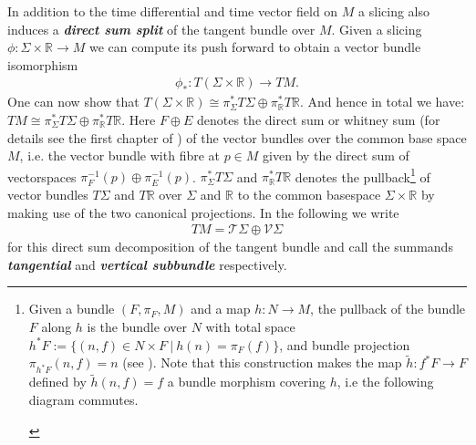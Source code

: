 \documentclass[a4paper,12pt, DIV=14, BCOR=5mm, twoside, headsepline]{scrbook}
\begin{document}
In addition to the time differential and time vector field on $M$ a slicing also induces a \textbf{\textit{direct sum split}} of the tangent bundle over $M$. Given a slicing $\phi : \Sigma \times \mathbb{R} \rightarrow M$ we can compute its push forward to obtain a vector bundle isomorphism
\begin{align}
\phi_{\ast}: T(\Sigma \times \mathbb{R}) \longrightarrow TM.
\end{align}
One can now show that $T(\Sigma \times \mathbb{R}) \cong \pi_{\Sigma}^{\ast}T\Sigma \oplus \pi_{\mathbb{R}}^{\ast} T\mathbb{R}$. And hence in total we have: $TM \cong \pi_{\Sigma}^{\ast}T\Sigma \oplus \pi_{\mathbb{R}}^{\ast} T\mathbb{R}$.
Here $F\oplus E$ denotes the direct sum or whitney sum (for details see the first chapter of \cite{nla.cat-vn705150}) of the vector bundles over the common base space $M$, i.e. the vector bundle with fibre at $p \in M$ given by the direct sum of vectorspaces $\pi_F^{-1}(p) \oplus \pi_E^{-1}(p)$. $\pi_{\Sigma}^{\ast}T\Sigma$ and $\pi_{\mathbb{R}}^{\ast}T\mathbb{R}$ denotes the pullback\footnote{Given a bundle $(F,\pi_F,M)$ and a map $h: N \rightarrow M$, the pullback of the bundle $F$ along $h$ is the bundle over $N$ with total space $h^{\ast}F := \{ (n,f) \in N \times F \ \vert \  h(n) = \pi_F(f)\}$, and bundle projection $\pi_{h^{\ast}F}(n,f) = n$ (see \cite{doi:10.1142/3867}). Note that this construction makes the map $\tilde{h}: f^{\ast}F \rightarrow F$ defined by $\tilde{h}(n,f) = f$ a bundle morphism covering $h$, i.e the following diagram commutes. 
\begin{center}
\end{center}} of vector bundles $T\Sigma$ and $T\mathbb{R}$ over $\Sigma$ and $\mathbb{R}$ to the common basespace $\Sigma \times \mathbb{R}$ by making use of the two canonical projections. In the following we write
\begin{align}
    TM = \mathcal{T}\Sigma \oplus \mathcal{V}\Sigma
\end{align} 
for this direct sum decomposition of the tangent bundle and call the summands \textit{\textbf{tangential}} and \textit{\textbf{vertical subbundle}} respectively.  
\end{document}
